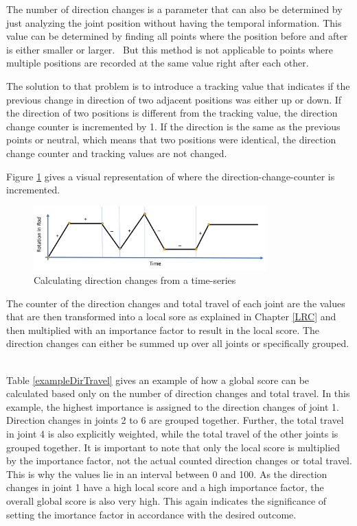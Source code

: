 The number of direction changes is a parameter that can also be determined by just analyzing the joint position without having the temporal information. This value can be determined by finding all points where the position before and after is either smaller or larger. 
But this method is not applicable to points where multiple positions are recorded at the same value right after each other.

The solution to that problem is to introduce a tracking value that indicates if the previous change in direction of two adjacent positions was either up or down. If the direction of two positions is different from the tracking value, the direction change counter is incremented by 1. If the direction is the same as the previous points or neutral, which means that two positions were identical, the direction change counter and tracking values are not changed.

Figure \ref{dirchange} gives a visual representation of where the direction-change-counter is incremented.

\begin{figure}[H]
	\centerline{\includegraphics[width=0.8\textwidth]{figures/dirchange.png}}
	\caption{Calculating direction changes from a time-series}
	\label{dirchange}
\end{figure}

The counter of the direction changes and total travel of each joint are the values that are then transformed into a local sore as explained in Chapter \ref{LRC} and then multiplied with an importance factor to result in the local score. The direction changes can either be summed up over all joints or specifically grouped.  

Table \ref{exampleDirTravel} gives an example of how a global score can be calculated based only on the number of direction changes and total travel. In this example, the highest importance is assigned to the direction changes of joint 1. Direction changes in joints 2 to 6 are grouped together. Further, the total travel in joint 4 is also explicitly weighted, while the total travel of the other joints is grouped together. It is important to note that only the local score is multiplied by the importance factor, not the actual counted direction changes or total travel. This is why the values lie in an interval between 0 and 100. As the direction changes in joint 1 have a high local score and a high importance factor, the overall global score is also very high. This again indicates the significance of setting the imortance factor in accordance with the desired outcome. 


